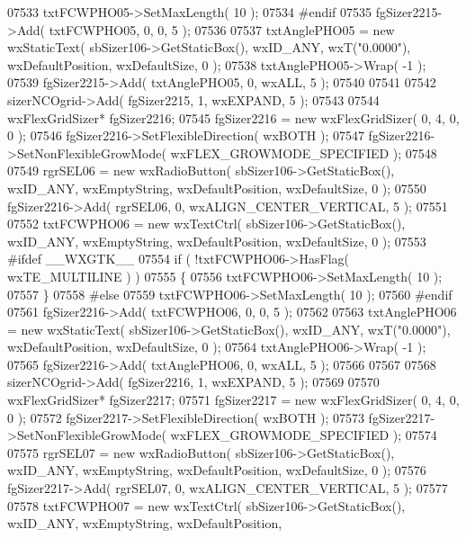 \begin{DoxyCode}
07533     txtFCWPHO05->SetMaxLength( 10 );
07534 \textcolor{preprocessor}{    #endif}
07535     fgSizer2215->Add( txtFCWPHO05, 0, 0, 5 );
07536     
07537     txtAnglePHO05 = \textcolor{keyword}{new} wxStaticText( sbSizer106->GetStaticBox(), wxID\_ANY, wxT(\textcolor{stringliteral}{"0.0000"}), 
      wxDefaultPosition, wxDefaultSize, 0 );
07538     txtAnglePHO05->Wrap( -1 );
07539     fgSizer2215->Add( txtAnglePHO05, 0, wxALL, 5 );
07540     
07541     
07542     sizerNCOgrid->Add( fgSizer2215, 1, wxEXPAND, 5 );
07543     
07544     wxFlexGridSizer* fgSizer2216;
07545     fgSizer2216 = \textcolor{keyword}{new} wxFlexGridSizer( 0, 4, 0, 0 );
07546     fgSizer2216->SetFlexibleDirection( wxBOTH );
07547     fgSizer2216->SetNonFlexibleGrowMode( wxFLEX\_GROWMODE\_SPECIFIED );
07548     
07549     rgrSEL06 = \textcolor{keyword}{new} wxRadioButton( sbSizer106->GetStaticBox(), wxID\_ANY, wxEmptyString, wxDefaultPosition, 
      wxDefaultSize, 0 );
07550     fgSizer2216->Add( rgrSEL06, 0, wxALIGN\_CENTER\_VERTICAL, 5 );
07551     
07552     txtFCWPHO06 = \textcolor{keyword}{new} wxTextCtrl( sbSizer106->GetStaticBox(), wxID\_ANY, wxEmptyString, wxDefaultPosition, 
      wxDefaultSize, 0 );
07553 \textcolor{preprocessor}{    #ifdef \_\_WXGTK\_\_}
07554     \textcolor{keywordflow}{if} ( !txtFCWPHO06->HasFlag( wxTE\_MULTILINE ) )
07555     \{
07556     txtFCWPHO06->SetMaxLength( 10 );
07557     \}
07558 \textcolor{preprocessor}{    #else}
07559     txtFCWPHO06->SetMaxLength( 10 );
07560 \textcolor{preprocessor}{    #endif}
07561     fgSizer2216->Add( txtFCWPHO06, 0, 0, 5 );
07562     
07563     txtAnglePHO06 = \textcolor{keyword}{new} wxStaticText( sbSizer106->GetStaticBox(), wxID\_ANY, wxT(\textcolor{stringliteral}{"0.0000"}), 
      wxDefaultPosition, wxDefaultSize, 0 );
07564     txtAnglePHO06->Wrap( -1 );
07565     fgSizer2216->Add( txtAnglePHO06, 0, wxALL, 5 );
07566     
07567     
07568     sizerNCOgrid->Add( fgSizer2216, 1, wxEXPAND, 5 );
07569     
07570     wxFlexGridSizer* fgSizer2217;
07571     fgSizer2217 = \textcolor{keyword}{new} wxFlexGridSizer( 0, 4, 0, 0 );
07572     fgSizer2217->SetFlexibleDirection( wxBOTH );
07573     fgSizer2217->SetNonFlexibleGrowMode( wxFLEX\_GROWMODE\_SPECIFIED );
07574     
07575     rgrSEL07 = \textcolor{keyword}{new} wxRadioButton( sbSizer106->GetStaticBox(), wxID\_ANY, wxEmptyString, wxDefaultPosition, 
      wxDefaultSize, 0 );
07576     fgSizer2217->Add( rgrSEL07, 0, wxALIGN\_CENTER\_VERTICAL, 5 );
07577     
07578     txtFCWPHO07 = \textcolor{keyword}{new} wxTextCtrl( sbSizer106->GetStaticBox(), wxID\_ANY, wxEmptyString, wxDefaultPosition, 

\end{DoxyCode}

